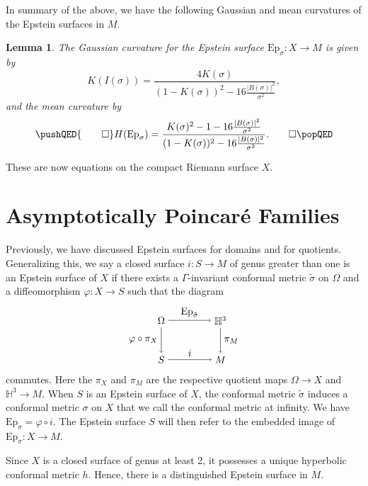 \documentclass{amsart}
\renewcommand{\H}{\mathbb{H}}
\newtheorem{lem}[thm]{Lemma}
\begin{document}
In summary of the above, we have the following Gaussian and mean curvatures of the Epstein surfaces in $M$.
\begin{lem}
\label{curvature-epstein}
The Gaussian curvature for the Epstein surface $\mathrm{Ep}_\sigma : X \to M$ is given by
\[
K(I(\sigma))
= \frac{4K(\sigma)}{(1-K(\sigma))^2 - 16 \frac{|B(\sigma)|^2}{\sigma^2}},
\]
and the mean curvature by 
\[
\pushQED{\qed}
H(\mathrm{Ep}_\sigma)
= \frac{K(\sigma)^2 - 1 - 16 \frac{|B(\sigma)|^2}{\sigma^2}}{(1-K(\sigma))^2 - 16 \frac{|B(\sigma)|^2}{\sigma^2}}.
\qedhere
\popQED
\]
\end{lem}
These are now equations on the compact Riemann surface $X$.






\section{Asymptotically Poincar\'e Families}




Previously, we have discussed Epstein surfaces for domains and for quotients. 
Generalizing this, we say a closed surface $i : S \to M$ of genus greater than one is an Epstein surface of $X$ if there exists a $\Gamma$-invariant conformal metric $\tilde{\sigma}$ on $\Omega$ and a diffeomorphism $\varphi : X \to S$ such that the diagram 
\[
\begin{tikzpicture}[scale=0.7]
\node (1) at (0,2) {$\Omega$};
\node (2) at (3,2) {$\H^3$};
\node (3) at (0,0) {$S$};
\node (4) at (3,0) {$M$};


\draw[->] (1) to node [above] {$\mathrm{Ep}_{\tilde{\sigma}}$} (2);
\draw[->] (1) to node [left] {$\varphi \circ \pi_X$} (3);
\draw[->] (3) to node [above] {$i$} (4);
\draw[->] (2) to node [right] {$\pi_M$} (4);

\end{tikzpicture}
\]
commutes. 
Here the $\pi_X$ and $\pi_M$ are the respective quotient maps $\Omega \to X$ and $\H^3 \to M$.
When $S$ is an Epstein surface of $X$, the conformal metric $\tilde{\sigma}$ induces a conformal metric $\sigma$ on $X$ that we call the conformal metric at infinity. 
We have $\mathrm{Ep}_{\sigma} = \varphi \circ i$. 
The Epstein surface $S$ will then refer to the embedded image of $\mathrm{Ep}_{\sigma}: X \to M$. 

Since $X$ is a closed surface of genus at least 2, it possesses a unique hyperbolic conformal metric $h$. 
Hence, there is a distinguished Epstein surface in $M$. 
\end{document}

